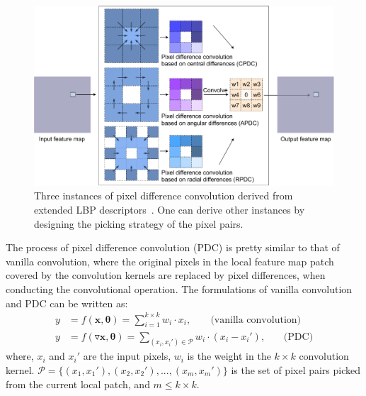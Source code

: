 \documentclass[10pt,twocolumn,letterpaper]{article}
\begin{document}
\begin{figure}[t!]
    \centering
    \includegraphics[width=1\linewidth]{images/pdc.pdf}
    \caption{Three instances of pixel difference convolution derived from extended LBP descriptors~\cite{liu2011sorted, liu2012extended, su2019bird}. One can derive other instances by designing the picking strategy of the pixel pairs.}
    \label{fig:pdc}
\end{figure}

The process of pixel difference convolution (PDC) is pretty similar to that of vanilla convolution, where the original pixels in the local feature map patch covered by the convolution kernels are replaced by pixel differences, when conducting the convolutional operation. The formulations of vanilla convolution and PDC can be written as:
\begin{align}
    y &= f(\pmb{x}, \pmb{\theta}) = \sum_{i=1}^{k\times k}w_{i}\cdot x_{i}, \;\;\;\;\;\;\; \text{(vanilla convolution)} \\
    y &= f(\triangledown\pmb{x}, \pmb{\theta}) = \sum_{(x_i, x_i')\in \pmb{\mathcal{P}}}w_{i}\cdot (x_i - x_i'), \;\;\;\;\;\;\, \text{(PDC)} \label{eq: pdc}
\end{align}
where, $x_i$ and $x_i'$ are the input pixels, $w_i$ is the weight in the $k \times k$ convolution kernel. $\pmb{\mathcal{P}} = \{(x_1, x_1'), (x_2, x_2'), ..., (x_m, x_m')\}$ is the set of pixel pairs picked from the current local patch, and $m\le k\times k$. 
\end{document}
